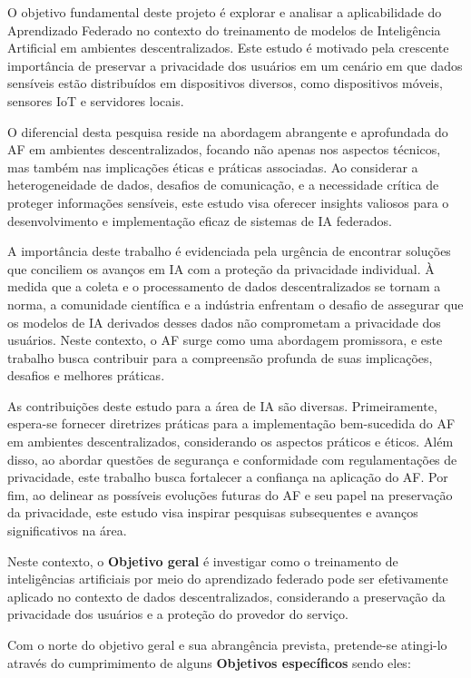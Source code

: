 O objetivo fundamental deste projeto é explorar e analisar a aplicabilidade do Aprendizado Federado no contexto do treinamento de modelos de Inteligência Artificial em ambientes descentralizados. Este estudo é motivado pela crescente importância de preservar a privacidade dos usuários em um cenário em que dados sensíveis estão distribuídos em dispositivos diversos, como dispositivos móveis, sensores IoT e servidores locais.

O diferencial desta pesquisa reside na abordagem abrangente e aprofundada do AF em ambientes descentralizados, focando não apenas nos aspectos técnicos, mas também nas implicações éticas e práticas associadas. Ao considerar a heterogeneidade de dados, desafios de comunicação, e a necessidade crítica de proteger informações sensíveis, este estudo visa oferecer insights valiosos para o desenvolvimento e implementação eficaz de sistemas de IA federados.

A importância deste trabalho é evidenciada pela urgência de encontrar soluções que conciliem os avanços em IA com a proteção da privacidade individual. À medida que a coleta e o processamento de dados descentralizados se tornam a norma, a comunidade científica e a indústria enfrentam o desafio de assegurar que os modelos de IA derivados desses dados não comprometam a privacidade dos usuários. Neste contexto, o AF surge como uma abordagem promissora, e este trabalho busca contribuir para a compreensão profunda de suas implicações, desafios e melhores práticas.

As contribuições deste estudo para a área de IA são diversas. Primeiramente, espera-se fornecer diretrizes práticas para a implementação bem-sucedida do AF em ambientes descentralizados, considerando os aspectos práticos e éticos. Além disso, ao abordar questões de segurança e conformidade com regulamentações de privacidade, este trabalho busca fortalecer a confiança na aplicação do AF. Por fim, ao delinear as possíveis evoluções futuras do AF e seu papel na preservação da privacidade, este estudo visa inspirar pesquisas subsequentes e avanços significativos na área.

Neste contexto, o \textbf{Objetivo geral} é investigar como o treinamento de inteligências artificiais por meio do aprendizado federado pode ser efetivamente aplicado no contexto de dados descentralizados, considerando a preservação da privacidade dos usuários e a proteção do provedor do serviço. 

Com o norte do objetivo geral e sua abrangência prevista, pretende-se atingi-lo através do cumprimimento de alguns \textbf{Objetivos específicos} sendo eles: 

